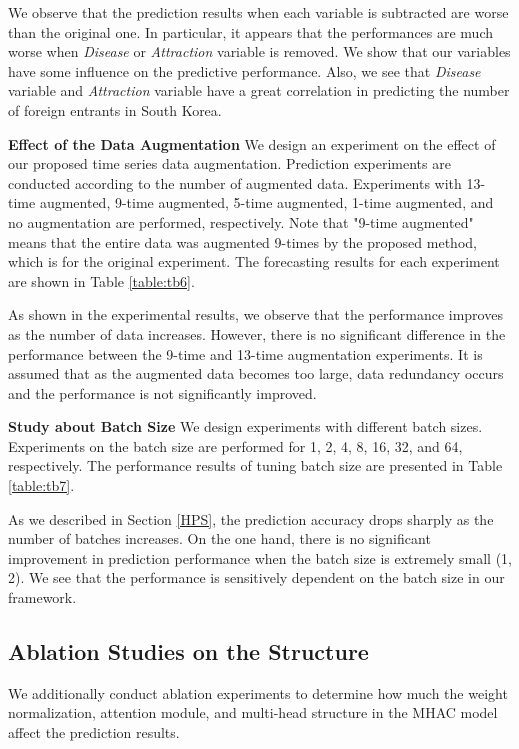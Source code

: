 \documentclass[conference]{IEEEtran}
\begin{document}
We observe that the prediction results when each variable is subtracted are worse than the original one. In particular, it appears that the performances are much worse when \textit{Disease} or \textit{Attraction} variable is removed. We show that our variables have some influence on the predictive performance. Also, we see that \textit{Disease} variable and \textit{Attraction} variable have a great correlation in predicting the number of foreign entrants in South Korea.

\noindent \textbf{Effect of the Data Augmentation} We design an experiment on the effect of our proposed time series data augmentation. Prediction experiments are conducted according to the number of augmented data. Experiments with 13-time augmented, 9-time augmented, 5-time augmented, 1-time augmented, and no augmentation are performed, respectively. Note that "9-time augmented" means that the entire data was augmented 9-times by the proposed method, which is for the original experiment. The forecasting results for each experiment are shown in Table \ref{table:tb6}.

As shown in the experimental results, we observe that the performance improves as the number of data increases. However, there is no significant difference in the performance between the 9-time and 13-time augmentation experiments. It is assumed that as the augmented data becomes too large, data redundancy occurs and the performance is not significantly improved.

\noindent \textbf{Study about Batch Size} We design experiments with different batch sizes. Experiments on the batch size are performed for 1, 2, 4, 8, 16, 32, and 64, respectively. The performance results of tuning batch size are presented in Table \ref{table:tb7}.

As we described in Section \ref{HPS}, the prediction accuracy drops sharply as the number of batches increases. On the one hand, there is no significant improvement in prediction performance when the batch size is extremely small (1, 2). We see that the performance is sensitively dependent on the batch size in our framework.

\subsection{Ablation Studies on the Structure} We additionally conduct ablation experiments to determine how much the weight normalization, attention module, and multi-head structure in the MHAC model affect the prediction results.
\end{document}
